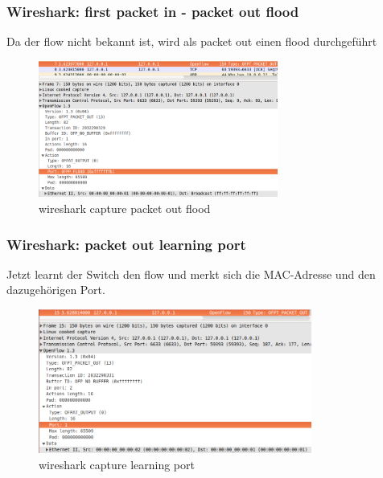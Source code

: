 \documentclass[a4,12pt]{scrartcl}
\begin{document}
\subsubsection{Wireshark: first packet in - packet out flood}
Da der flow nicht bekannt ist, wird als packet out einen flood durchgeführt 
\begin{figure} [H]
	\begin{center}
	\includegraphics[width=0.70\textwidth]{./pictures/ex3_paket_out.png}
	\caption{wireshark capture packet out flood}
	\label{x}
	\end{center}
\end{figure} 

\subsubsection{Wireshark: packet out learning port}
Jetzt learnt der Switch den flow und merkt sich die MAC-Adresse und den dazugehörigen Port. 
\begin{figure} [H]
	\begin{center}
	\includegraphics[width=0.80\textwidth]{./pictures/ex3_paket_out_port.png}
	\caption{wireshark capture learning port}
	\label{x}
	\end{center}
\end{figure} 
\end{document}
